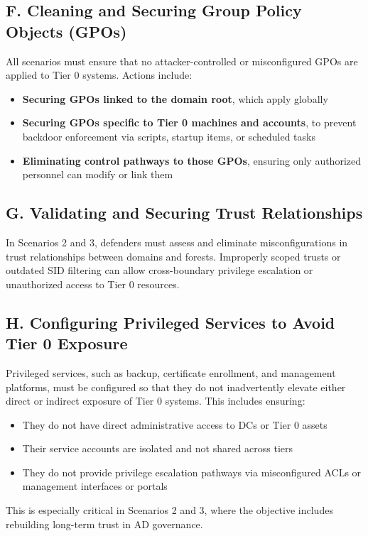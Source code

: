 \subsection{F. Cleaning and Securing Group Policy Objects (GPOs)}
All scenarios must ensure that no attacker-controlled or misconfigured GPOs are applied to Tier 0 systems. Actions include:
\begin{itemize}
    \item \textbf{Securing GPOs linked to the domain root}, which apply globally
    \item \textbf{Securing GPOs specific to Tier 0 machines and accounts}, to prevent backdoor enforcement via scripts, startup items, or scheduled tasks
    \item \textbf{Eliminating control pathways to those GPOs}, ensuring only authorized personnel can modify or link them
\end{itemize}

\subsection{G. Validating and Securing Trust Relationships}
In Scenarios 2 and 3, defenders must assess and eliminate misconfigurations in trust relationships between domains and forests. Improperly scoped trusts or outdated SID filtering can allow cross-boundary privilege escalation or unauthorized access to Tier 0 resources.

\subsection{H. Configuring Privileged Services to Avoid Tier 0 Exposure}
Privileged services, such as backup, certificate enrollment, and management platforms, must be configured so that they do not inadvertently elevate either direct or indirect exposure of Tier 0 systems. This includes ensuring:
\begin{itemize}
    \item They do not have direct administrative access to DCs or Tier 0 assets
    \item Their service accounts are isolated and not shared across tiers
    \item They do not provide privilege escalation pathways via misconfigured ACLs or management interfaces or portals
\end{itemize}

This is especially critical in Scenarios 2 and 3, where the objective includes rebuilding long-term trust in AD governance.

